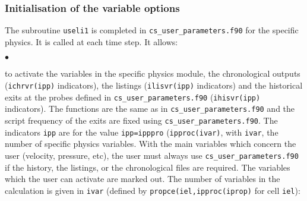 {{{%
\subsubsection {Initialisation of the variable options}
\label{prg_useli1}%

The subroutine \texttt{useli1} is completed in \texttt{cs\_user\_parameters.f90} for the specific
 physics. It is called at each time step. It allows:
\begin{list}{$\bullet$}{}
\item to activate the variables in the specific physics module, the chronological
outputs (\texttt{ichrvr(ipp)} indicators), the listings (\texttt{ilisvr(ipp)}
indicators) and the
historical exits at the probes defined in \texttt{cs\_user\_parameters.f90} (\texttt{ihisvr(ipp)}
indicators).
The functions are the same as in \texttt{cs\_user\_parameters.f90} and the script frequency of the
exits are fixed using \texttt{cs\_user\_parameters.f90}. The indicators \texttt{ipp} are for the
 value \texttt{ipp=ipppro} (\texttt{ipproc(ivar)}, with \texttt{ivar}, the number
 of specific physics variables. With the main variables
 which concern the user (velocity, pressure, etc), the user must always use
 \texttt{cs\_user\_parameters.f90} if the history, the listings, or the chronological files are required.
 The variables which the user can activate are marked out. The number of variables in
the calculation is given in \texttt{ivar} (defined by
\texttt{propce(iel,ipproc(iprop)} for cell \texttt{iel}):


\end{list}}}}
